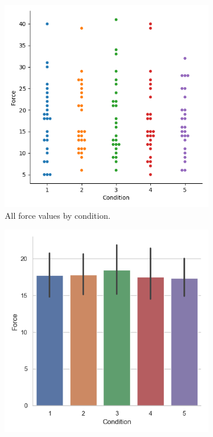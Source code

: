 \begin{figure}[H]
\hspace*{\fill}
     \begin{subfigure}[b]{0.4\textwidth}
         \centering
         \vspace*{-10mm}
         \includegraphics[width=\textwidth]{Files/Plots/force_by_cond_swarm.png}
         \caption{All force values by condition.}
         \label{fig:allForceSwarm}
     \end{subfigure}
     \hspace*{\fill}
     \begin{subfigure}[b]{0.4\textwidth}
         \centering
         \includegraphics[width=\textwidth]{Files/Plots/force_mean_by_condition.png}

\end{subfigure}
\end{figure}
